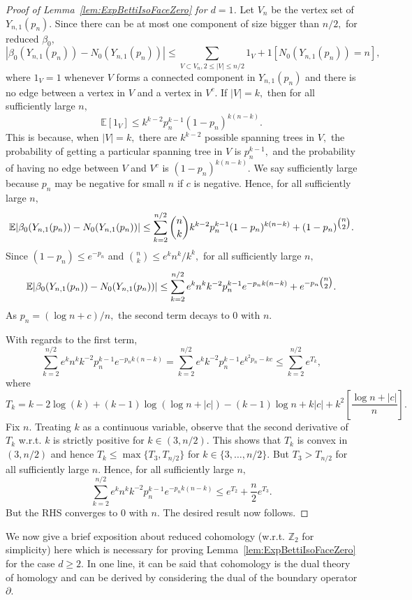 \documentclass[12pt]{amsart}
\numberwithin{equation}{section}
\numberwithin{theorem}{section}
\newcommand{\1}{\mathbf{1}}
\def\bZ{\mathbb{Z}}
\def\EP{\mathbb{E}}
\begin{document}
\begin{proof}[Proof of Lemma~\ref{lem:ExpBettiIsoFaceZero} for $d = 1$]
%
Let $V_n$ be the vertex set of $Y_{n, 1}(p_n).$ Since there can be at most one component of size bigger than $n/2,$ for reduced $\beta_0,$
\[
|\beta_0(Y_{n, 1}(p_{n})) - N_0(Y_{n, 1}(p_n))| \leq \sum_{V \subset V_{n}, 2 \leq |V| \leq n/2} 1_{V} + 1[N_0(Y_{n, 1}(p_n)) = n],
\]
%
where $1_V = 1$ whenever $V$ forms a connected component in $Y_{n, 1}(p_n)$ and there is no edge between a vertex in $V$ and a vertex in $V^c.$ If $|V| = k,$ then for all sufficiently large $n,$
%
\[
\mathbb{E}[1_{V}]  \leq k^{k - 2} p_n^{k - 1} (1 - p_n)^{k (n - k)}.
\]
This is because, when $|V| = k,$ there are $k^{k - 2}$ possible spanning trees in $V,$ the probability of getting a particular spanning tree in $V$ is $p_n^{k - 1},$ and the probability of having no edge between $V$ and $V^c$ is $(1 - p_n)^{k (n - k)}.$ We say sufficiently large because $p_n$ may be negative for small $n$ if $c$ is negative.  Hence, for all sufficiently large $n,$
\[
\EP|\beta_0(Y_{n, 1}(p_{n})) - N_0(Y_{n, 1}(p_n))| \leq \sum_{k = 2}^{n/2} \binom{n}{k} k^{k - 2} p_n^{k - 1} (1 - p_n)^{k (n - k)} + (1 - p_n)^{\tbinom{n}{2}}.
\]
%
Since $(1 - p_n) \leq e^{-p_n}$ and $\binom{n}{k} \leq e^k n^k /k^k,$ for all sufficiently large $n,$
\[
\EP|\beta_0(Y_{n, 1}(p_{n})) - N_0(Y_{n, 1}(p_n))| \leq \sum_{k = 2}^{n/2} e^{k} n^{k} k^{- 2} p_n^{k - 1} e^{- p_n k (n - k)} + e^{-p_n\tbinom{n}{2}}.
\]
As $p_n = (\log n + c)/n,$ the second term decays to $0$ with $n.$

With regards to the first term,
\[
\sum_{k = 2}^{n/2} e^{k} n^{k} k^{- 2} p_n^{k - 1} e^{- p_n k (n - k)} =  \sum_{k = 2}^{n/2} e^{k} k^{- 2} p_n^{k - 1} e^{k^2p_n -kc} \leq  \sum_{k = 2}^{n/2}  e^{T_k} ,
\]
%
where
\[
T_k = k - 2 \log(k) + (k - 1) \log(\log n + |c|) - (k - 1) \log n + k|c| + k^2  \left[\frac{\log n + |c|}{n}\right].
\]
%
Fix $n.$ Treating $k$ as a continuous variable, observe that the second derivative of $T_k$ w.r.t. $k$ is strictly positive for $k \in (3, n/2).$ This shows that $T_k$ is convex in $(3, n/2)$ and hence $T_k \leq \max\{T_3, T_{n/2}\}$ for $k \in \{3, \ldots, n/2\}.$ But $T_3 > T_{n/2}$ for all sufficiently large $n.$ Hence, for all sufficiently large $n,$
\[
\sum_{k = 2}^{n/2} e^{k} n^{k} k^{- 2} p_n^{k - 1} e^{- p_n k (n - k)} \leq  e^{T_2} + \frac{n}{2}e^{T_3}.
\]
%
But the RHS converges to $0$ with $n.$ The desired result now follows.
\end{proof}

We now give a brief exposition about reduced cohomology (w.r.t. $\bZ_2$ for simplicity) here which is necessary for proving Lemma~\ref{lem:ExpBettiIsoFaceZero} for the case $d \geq 2.$ In one line, it can be said that cohomology is the dual theory of homology and can be derived by considering the dual of the boundary operator $\partial$.
\end{document}
